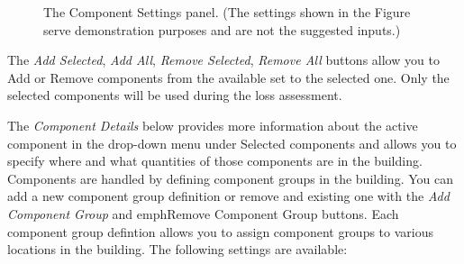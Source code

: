 \begin{figure}[!htbp]
	\caption{The Component Settings panel. (The settings shown in the Figure serve demonstration purposes and are not the suggested inputs.)}
	\label{fig:dl_p58_comp}
\end{figure}

The \emph{Add Selected}, \emph{Add All}, \emph{Remove Selected}, \emph{Remove All} buttons allow you to Add or Remove components from the available set to the selected one. Only the selected components will be used during the loss assessment.

The \emph{Component Details} below provides more information about the active component in the drop-down menu under Selected components and allows you to specify where and what quantities of those components are in the building. Components are handled by defining component groups in the building. You can add a new component group definition or remove and existing one with the \emph{Add Component Group} and emph{Remove Component Group} buttons. Each component group defintion allows you to assign component groups to various locations in the building. The following settings are available:

